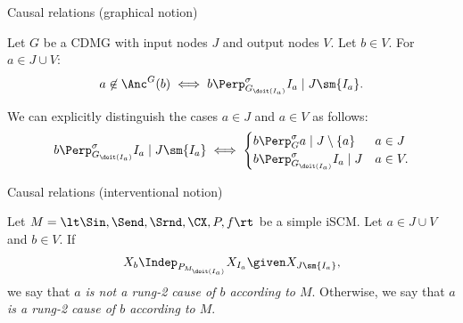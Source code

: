 \begin{frame}{Causal relations (graphical notion)}
\begin{Prp}[\ref{prp:graph_cause_of}]
  Let $G$ be a CDMG with input nodes $J$ and output nodes $V$.
  Let $b \in V$.
  For $a \in J \cup V$:
    \begin{equation*}
      a \not\in \Anc^G(b) \iff b \Perp^\sigma_{G_{\doit(I_a)}} I_a \mid J \sm \{I_a\}.
    \end{equation*}
\end{Prp}

\begin{Rem}
  We can explicitly distinguish the cases $a \in J$ and $a \in V$ as follows:
  $$b \Perp^\sigma_{G_{\doit(I_a)}} I_a \mid J \sm \{I_a\} \iff \begin{cases}
    b \Perp^\sigma_{G} a \mid J \setminus \{a\} & a \in J \\
    b \Perp^\sigma_{G_{\doit(I_a)}} I_a \mid J & a \in V.
  \end{cases}$$
\end{Rem}
\end{frame}


\begin{frame}[t]{Causal relations (interventional notion)}
\begin{Def}[\ref{def:scm_rung2_cause_of}]
  Let $M = \lt \Sin, \Send, \Srnd, \CX, P, f \rt$ be a simple iSCM.
  Let $a \in J \cup V$ and $b \in V$.
  If
    \begin{equation*}
      X_b \Indep_{P_{M_{\doit(I_a)}}} X_{I_a} \given X_{J \sm \{I_a\}},
    \end{equation*}
  we say that \emph{$a$ is not a rung-2 cause of $b$ according to $M$}.
  Otherwise, we say that \emph{$a$ is a rung-2 cause of $b$ according to $M$}.
\end{Def}

\bigskip
\end{frame}

